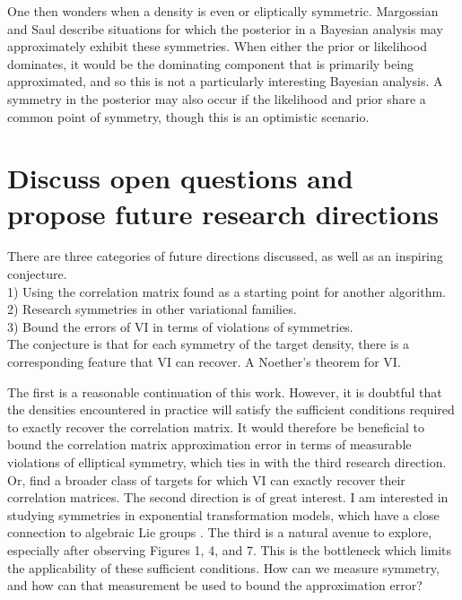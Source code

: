 \documentclass{article}
\begin{document}
One then wonders when a density is even or eliptically symmetric.
Margossian and Saul describe situations for which the posterior in a Bayesian analysis may approximately exhibit these symmetries.
When either the prior or likelihood dominates, it would be the dominating component that is primarily being approximated,
and so this is not a particularly interesting Bayesian analysis.
A symmetry in the posterior may also occur if the likelihood and prior share a common point of symmetry, though this is an optimistic scenario.





\section{Discuss open questions and propose future research directions}

There are three categories of future directions discussed, as well as an inspiring conjecture. \\
1) Using the correlation matrix found as a starting point for another algorithm. \\
2) Research symmetries in other variational families. \\
3) Bound the errors of VI in terms of violations of symmetries. \\
The conjecture is that for each symmetry of the target density, there is a corresponding feature that VI can recover. A Noether's theorem for VI.

The first is a reasonable continuation of this work.
However, it is doubtful that the densities encountered in practice will satisfy the sufficient conditions required to exactly recover the correlation matrix.
It would therefore be beneficial to bound the correlation matrix approximation error in terms of measurable violations of elliptical symmetry,
which ties in with the third research direction.
Or, find a broader class of targets for which VI can exactly recover their correlation matrices.
The second direction is of great interest.
I am interested in studying symmetries in exponential transformation models, which have a close connection to algebraic Lie groups \cite{barndorff1982exponential}.
The third is a natural avenue to explore, especially after observing Figures 1, 4, and 7.
This is the bottleneck which limits the applicability of these sufficient conditions.
How can we measure symmetry, and how can that measurement be used to bound the approximation error?
\end{document}

